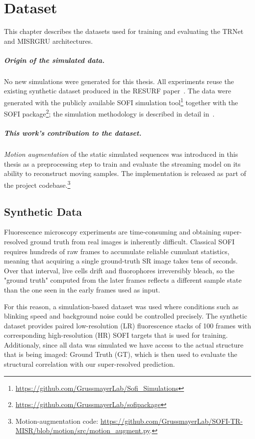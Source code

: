 \chapter{Dataset}
\label{ch:datasets}

This chapter describes the datasets used for training and evaluating the TRNet and MISRGRU architectures.

\paragraph{Origin of the simulated data.}
No new simulations were generated for this thesis. All experiments reuse the
existing synthetic dataset produced in the RESURF paper~\cite{resurf2024}.
The data were generated with the publicly available SOFI simulation
tool\footnote{\url{https://github.com/GrussmayerLab/Sofi_Simulations}} together
with the SOFI package\footnote{\url{https://github.com/GrussmayerLab/sofipackage}};
the simulation methodology is described in detail in~\cite{jelle2024, resurf2024}.

\paragraph{This work's contribution to the dataset.}
\emph{Motion augmentation} of the static simulated sequences was introduced in this thesis 
as a preprocessing step to train and
evaluate the streaming model on its ability to reconstruct moving samples.
The implementation is released as part of the
project codebase.\footnote{Motion-augmentation code:
\url{https://github.com/GrussmayerLab/SOFI-TR-MISR/blob/motion/src/motion_augment.py}.}

\section{Synthetic Data }
\label{sec:synthetic}
Fluorescence microscopy experiments are time-consuming and obtaining
super-resolved ground truth from real images is inherently difficult.
Classical SOFI requires hundreds of raw frames to accumulate reliable cumulant statistics,
meaning that acquiring a single ground-truth SR image takes tens of seconds.
Over that interval, live cells drift and fluorophores
irreversibly bleach, so the "ground truth" computed from the later frames reflects
a different sample state than the one seen in the early frames used as input.

For this reason, a simulation-based dataset was used where conditions such as
blinking speed and background noise could be controlled precisely.
The synthetic dataset provides paired low-resolution (LR)
fluorescence stacks of 100 frames with corresponding high-resolution 
(HR) SOFI targets that is used for training. Additionaly, since all data was simulated 
we have access to the actual structure that is being imaged: Ground Truth (GT), 
which is then used to evaluate the structural correlation with our super-resolved prediction.

